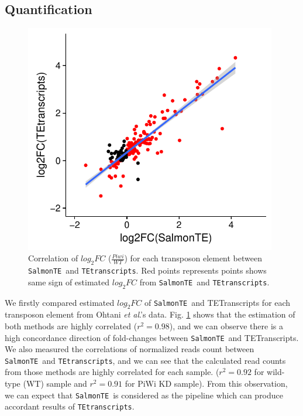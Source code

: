 \documentclass{ws-procs11x85}
\newcommand{\etal}{\textit{et al}.}
\newcommand{\TEtranscripts}{\texttt{TEtranscripts}}
\newcommand{\SalmonTE}{\texttt{SalmonTE}}
\begin{document}
\subsection{Quantification}

\begin{figure}[h]
\centerline{
\includegraphics[width=11cm]{figure_corr_FC}
}
\caption{Correlation of $log_{2}FC$ ($\frac{Piwi}{WT}$) for each transposon element between \SalmonTE~and \TEtranscripts. Red points represents points shows same sign of estimated $log_{2}FC$ from \SalmonTE~and \TEtranscripts.}
\label{aba:fig2}
\end{figure}

We firstly compared estimated $log_{2}FC$ of \SalmonTE~and TETranscripts for each transposon element from Ohtani \etal's data. 
Fig. \ref{aba:fig2} shows that the estimation of both methods are highly correlated ($r^{2}=0.98$), and we can observe there is a high concordance direction of fold-changes between \SalmonTE~and TETranscripts. We also measured the correlations of normalized reads count between \SalmonTE~and \TEtranscripts, 
and we can see that the calculated read counts from those methods are highly correlated for each sample. ($r^2=0.92$ for wild-type (WT) sample and $r^2=0.91$ for PiWi KD sample).
From this observation, we can expect that \SalmonTE~is considered as the pipeline which can produce accordant results of \TEtranscripts.
\end{document}
